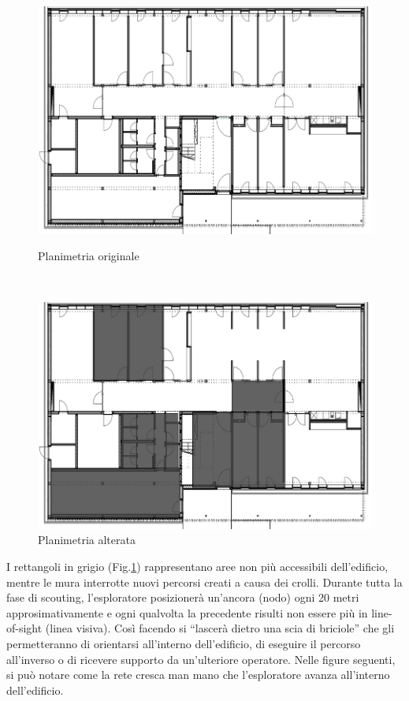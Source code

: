 \begin{figure}[h]
	\begin{minipage}[b]{6cm}
		\centering
		\includegraphics[scale=0.35]{Introduzione/piantina1.png}
		\caption{Planimetria originale}
		\label{fig:planOriginale}
	\end{minipage}
	\ \hspace{10 mm} \
	\begin{minipage}[b]{6cm}
		\centering
		\includegraphics[scale=0.35]{Introduzione/piantina2.png}
		\caption{Planimetria alterata}
		\label{fig:planAlterata}
	\end{minipage}
\end{figure}

\newpage
I rettangoli in grigio (Fig.\ref{fig:planAlterata}) rappresentano aree non più accessibili dell’edificio, mentre le mura interrotte nuovi percorsi creati a causa dei crolli. 
Durante tutta la fase di scouting, l’esploratore posizionerà un’ancora (nodo) ogni 20 metri approsimativamente e ogni qualvolta la precedente risulti non essere più in line-of-sight (linea visiva). Così facendo si “lascerà dietro una scia di briciole” che gli permetteranno di orientarsi all’interno dell’edificio, di eseguire il percorso all’inverso o di ricevere supporto da un’ulteriore operatore. Nelle figure seguenti, si può notare come la rete cresca man mano che l'esploratore avanza all'interno dell'edificio.

